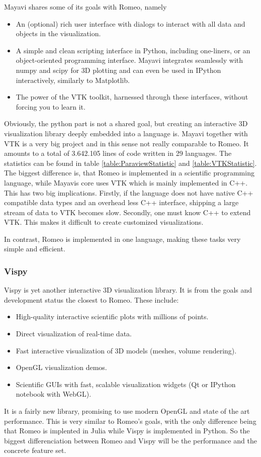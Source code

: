 Mayavi shares some of its goals with Romeo, namely\cite{MayaviGoals}
\begin{itemize}
	\item An (optional) rich user interface with dialogs to interact with all data and objects in the visualization.
	\item A simple and clean scripting interface in Python, including one-liners, or an object-oriented programming interface. Mayavi integrates seamlessly with numpy and scipy for 3D plotting and can even be used in IPython interactively, similarly to Matplotlib.
	\item The power of the VTK toolkit, harnessed through these interfaces, without forcing you to learn it.
\end{itemize}
Obviously, the python part is not a shared goal, but creating an interactive 3D visualization library deeply embedded into a language is.
Mayavi together with VTK is a very big project and in this sense not really comparable to Romeo.
It amounts to a total of 3.642.105 lines of code written in 29 languages. The statistics can be found in table \ref{table:ParaviewStatistic} and \ref{table:VTKStatistic}.
The biggest difference is, that Romeo is implemented in a scientific programming language, while Mayavis core uses VTK which is mainly implemented in C++.
This has two big implications.
Firstly, if the language does not have native C++ compatible data types and an overhead less C++ interface, shipping a large stream of data to VTK becomes slow.
Secondly, one must know C++ to extend VTK. This makes it difficult to create customized visualizations.

In contrast, Romeo is implemented in one language, making these tasks very simple and efficient.


\subsubsection{Vispy}

Vispy is yet another interactive 3D visualization library. It is from the goals and development status the closest to Romeo.
These include\cite{VispyGoals}:

\begin{itemize}
	\item High-quality interactive scientific plots with millions of points.
	\item Direct visualization of real-time data.
	\item Fast interactive visualization of 3D models (meshes, volume rendering).
	\item OpenGL visualization demos.
	\item Scientific GUIs with fast, scalable visualization widgets (Qt or IPython notebook with WebGL).
\end{itemize}
It is a fairly new library, promising to use modern OpenGL and state of the art performance.
This is very similar to Romeo's goals, with the only difference being that Romeo is implented in Julia while Vispy is implemented in Python.
So the biggest differenciation between Romeo and Vispy will be the performance and the concrete feature set.

